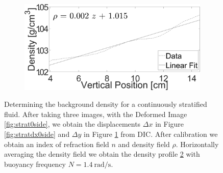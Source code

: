 \documentclass{svjour3}                     %
\begin{document}
\begin{figure}[htbp]
\begin{subfigure}{.5\linewidth}
		\label{fig:stratdy0side}
\end{subfigure}%
\begin{subfigure}{.5\linewidth}
		\centering \includegraphics[width = \textwidth]{Strat_DensityProfile}
		\label{fig:stratrho0deformed0side}
\end{subfigure} 
\caption{Determining the background density for a continuously stratified fluid. After taking three images, with the Deformed Image \ref{fig:strat0side}, we obtain the displacements $\Delta x$ in Figure \ref{fig:stratdx0side} and $\Delta y$ in Figure \ref{fig:stratdy0side} from DIC. After calibration we obtain an index of refraction field $n$ and density field $\rho$. Horizontally averaging the density field we obtain the density profile \ref{fig:stratrho0deformed0side} with buoyancy frequency $N = \SI{1.4}{\radian\per\second}$.}
\label{figs:strat0side}
\end{figure}
\end{document}
